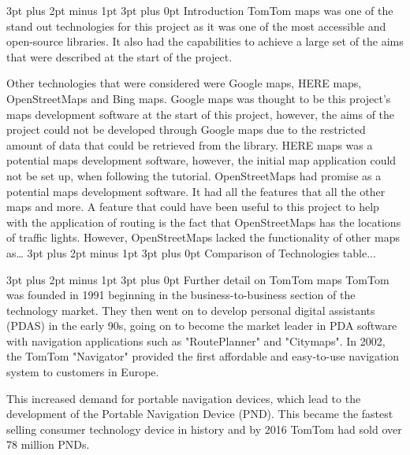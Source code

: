 \documentclass[12pt,a4paper]{article}
\makeatletter
\renewcommand\subsection{\@startsection {subsection}{1}{0mm} %
                               {3pt plus 2pt minus 1pt} %
                               {3pt plus 0pt} %
                               {\normalfont\bfseries}}
\makeatother
\begin{document}
\subsection{Introduction}
TomTom maps was one of the stand out technologies for this project as it was one of the most accessible and open-source libraries. It also had the capabilities to achieve a large set of the aims that were described at the start of the project.  

Other technologies that were considered were Google maps, HERE maps, OpenStreetMaps and Bing maps. Google maps was thought to be this project’s maps development software at the start of this project, however, the aims of the project could not be developed through Google maps due to the restricted amount of data that could be retrieved from the library. HERE maps was a potential maps development software, however, the initial map application could not be set up, when following the tutorial. OpenStreetMaps had promise as a potential maps development software. It had all the features that all the other maps and more. A feature that could have been useful to this project to help with the application of routing is the fact that OpenStreetMaps has the locations of traffic lights. However, OpenStreetMaps lacked the functionality of other maps as…
\subsection{Comparison of Technologies}
table...
\begin{table}
  
\end{table}

\subsection{Further detail on TomTom maps}
TomTom was founded in 1991 beginning in the business-to-business section of the technology market. They then went on to develop personal digital assistants (PDAS) in the early 90s, going on to become the market leader in PDA software with navigation applications such as "RoutePlanner" and "Citymaps". In 2002, the TomTom "Navigator" provided the first affordable and easy-to-use navigation system to customers in Europe.

This increased demand for portable navigation devices, which lead to the development of the Portable Navigation Device (PND). This became the fastest selling consumer technology device in history and by 2016 TomTom had sold over 78 million PNDs.
\end{document}
